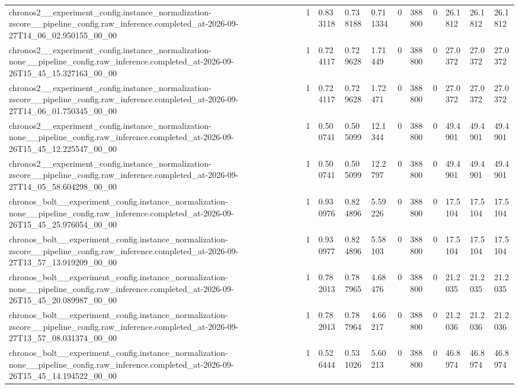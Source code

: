 \begin{tabular}{lllllllllll}
chronos2\_\_experiment\_config.instance\_normalization-zscore\_\_pipeline\_config.raw\_inference.completed\_at-2026-09-27T14\_06\_02.950155\_00\_00 & 1 & 0.833118 & 0.738188 & 0.711334 & 0 & 388800 & 0 & 26.1812 & 26.1812 & 26.1812 \\
chronos2\_\_experiment\_config.instance\_normalization-none\_\_pipeline\_config.raw\_inference.completed\_at-2026-09-26T15\_45\_15.327163\_00\_00 & 1 & 0.724117 & 0.729628 & 1.71449 & 0 & 388800 & 0 & 27.0372 & 27.0372 & 27.0372 \\
chronos2\_\_experiment\_config.instance\_normalization-zscore\_\_pipeline\_config.raw\_inference.completed\_at-2026-09-27T14\_06\_01.750345\_00\_00 & 1 & 0.724117 & 0.729628 & 1.72471 & 0 & 388800 & 0 & 27.0372 & 27.0372 & 27.0372 \\
chronos2\_\_experiment\_config.instance\_normalization-none\_\_pipeline\_config.raw\_inference.completed\_at-2026-09-26T15\_45\_12.225547\_00\_00 & 1 & 0.500741 & 0.505099 & 12.1344 & 0 & 388800 & 0 & 49.4901 & 49.4901 & 49.4901 \\
chronos2\_\_experiment\_config.instance\_normalization-zscore\_\_pipeline\_config.raw\_inference.completed\_at-2026-09-27T14\_05\_58.604298\_00\_00 & 1 & 0.500741 & 0.505099 & 12.2797 & 0 & 388800 & 0 & 49.4901 & 49.4901 & 49.4901 \\
chronos\_bolt\_\_experiment\_config.instance\_normalization-none\_\_pipeline\_config.raw\_inference.completed\_at-2026-09-26T15\_45\_25.976054\_00\_00 & 1 & 0.930976 & 0.824896 & 5.59226 & 0 & 388800 & 0 & 17.5104 & 17.5104 & 17.5104 \\
chronos\_bolt\_\_experiment\_config.instance\_normalization-zscore\_\_pipeline\_config.raw\_inference.completed\_at-2026-09-27T13\_57\_13.919209\_00\_00 & 1 & 0.930977 & 0.824896 & 5.58103 & 0 & 388800 & 0 & 17.5104 & 17.5104 & 17.5104 \\
chronos\_bolt\_\_experiment\_config.instance\_normalization-none\_\_pipeline\_config.raw\_inference.completed\_at-2026-09-26T15\_45\_20.089987\_00\_00 & 1 & 0.782013 & 0.787965 & 4.68476 & 0 & 388800 & 0 & 21.2035 & 21.2035 & 21.2035 \\
chronos\_bolt\_\_experiment\_config.instance\_normalization-zscore\_\_pipeline\_config.raw\_inference.completed\_at-2026-09-27T13\_57\_08.031374\_00\_00 & 1 & 0.782013 & 0.787964 & 4.66217 & 0 & 388800 & 0 & 21.2036 & 21.2036 & 21.2036 \\
chronos\_bolt\_\_experiment\_config.instance\_normalization-none\_\_pipeline\_config.raw\_inference.completed\_at-2026-09-26T15\_45\_14.194522\_00\_00 & 1 & 0.526444 & 0.531026 & 5.60213 & 0 & 388800 & 0 & 46.8974 & 46.8974 & 46.8974 \\

\end{tabular}
